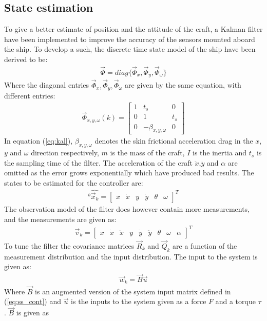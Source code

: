 \documentclass{ifacconf}
\begin{document}
\subsection{State estimation}
To give a better estimate of position and the attitude of the craft, a Kalman filter have been implemented to improve the accuracy of the sensors mounted aboard the ship. To develop a such, the discrete time state model of the ship have been derived to be:
\begin{align}
\vec{\Phi} = diag\{\vec{\Phi} _x,\vec{\Phi} _y,\vec{\Phi} _\omega\}
\end{align}
Where the diagonal entries $\vec{\Phi} _x,\vec{\Phi} _y,\vec{\Phi} _\omega$ are given by the same equation, with different entries:
\begin{align}
\vec{\Phi}_{x,y,\omega}(k) = \begin{bmatrix}
1 & t_s & 0\\
0 & 1 & t_s\\
0 & -\beta_{x,y,\omega} & 0
\end{bmatrix}
\label{eq:kal}
\end{align}
In equation (\ref{eq:kal}), $\beta_{x,y,\omega}$ denotes the skin frictional acceleration drag in the $x$,$y$ and $\omega$ direction respectively, $m$ is the mass of the craft, $I$ is the inertia and $t_s$ is the sampling time of the filter. The acceleration of the craft $\ddot{x}$,$\ddot{y}$ and $\alpha$ are omitted as the error grows exponentially which have produced bad results. The states to be estimated for the controller are:
\begin{align}
^b\hat{\vec{x}_k} = \begin{bmatrix}
x & \dot{x} & y & \dot{y} & \theta & \omega
\end{bmatrix}^T
\end{align}
The observation model of the filter does however contain more measurements, and the measurements are given as:
\begin{align}
\vec{v}_k = \begin{bmatrix}
x & \dot{x} & \ddot{x} & y & \dot{y} & \ddot{y} & \theta & \omega & \alpha
\end{bmatrix}^T
\end{align}
To tune the filter the covariance matrices $\vec{R}_k$ and $\vec{Q}_k$ are a function of the measurement distribution and the input distribution. The input to the system is given as:
\begin{align}
\vec{w}_k = \vec{B}\vec{u}
\end{align}
Where $\vec{B}$ is an augmented version of the system input matrix defined in (\ref{eq:ss_cont}) and $\vec{u}$ is the inputs to the system given as a force $F$ and a torque $\tau$. $\vec{B}$ is given as 
\end{document}
